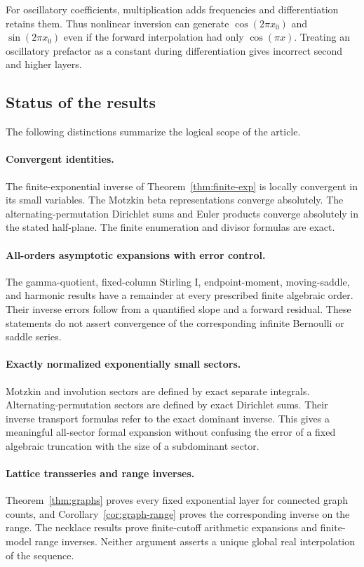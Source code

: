 \documentclass[11pt,a4paper]{article}
\numberwithin{equation}{section}
\theoremstyle{definition}
\theoremstyle{remark}
\begin{document}
For oscillatory coefficients, multiplication adds frequencies and differentiation retains them. Thus nonlinear inversion can generate $\cos(2\pi x_0)$ and $\sin(2\pi x_0)$ even if the forward interpolation had only $\cos(\pi x)$. Treating an oscillatory prefactor as a constant during differentiation gives incorrect second and higher layers.

\subsection{Status of the results}

The following distinctions summarize the logical scope of the article.

\paragraph{Convergent identities.}
The finite-exponential inverse of Theorem~\ref{thm:finite-exp} is locally convergent in its small variables. The Motzkin beta representations converge absolutely. The alternating-permutation Dirichlet sums and Euler products converge absolutely in the stated half-plane. The finite enumeration and divisor formulas are exact.

\paragraph{All-orders asymptotic expansions with error control.}
The gamma-quotient, fixed-column Stirling I, endpoint-moment, moving-saddle, and harmonic results have a remainder at every prescribed finite algebraic order. Their inverse errors follow from a quantified slope and a forward residual. These statements do not assert convergence of the corresponding infinite Bernoulli or saddle series.

\paragraph{Exactly normalized exponentially small sectors.}
Motzkin and involution sectors are defined by exact separate integrals. Alternating-permutation sectors are defined by exact Dirichlet sums. Their inverse transport formulas refer to the exact dominant inverse. This gives a meaningful all-sector formal expansion without confusing the error of a fixed algebraic truncation with the size of a subdominant sector.

\paragraph{Lattice transseries and range inverses.}
Theorem~\ref{thm:graphs} proves every fixed exponential layer for connected graph counts, and Corollary~\ref{cor:graph-range} proves the corresponding inverse on the range. The necklace results prove finite-cutoff arithmetic expansions and finite-model range inverses. Neither argument asserts a unique global real interpolation of the sequence.
\end{document}
